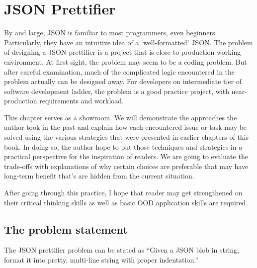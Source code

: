 
\chapter{JSON Prettifier}\label{ch:json-prettifier}

By and large, JSON is familiar to most programmers, even beginners.
Particularly, they have an intuitive idea of a `well-formatted' JSON\@.
The problem of designing a JSON prettifier is a project that is close to production working
environment.
At first sight, the problem may seem to be a coding problem.
But after careful examination, much of the complicated logic encountered in
the problem actually can be designed away.
For developers on intermediate tier of software development ladder,
the problem is a good practice project, with near-production requirements and workload.

This chapter serves as a showroom.
We will demonstrate the approaches the author took in the past and
explain how each encountered issue or task may be solved using the various strategies that were
presented in earlier chapters of this book.
In doing so, the author hope to put those techniques and strategies in a practical perspective
for the inspiration of readers.
We are going to evaluate the trade-offs with explanations of why certain choices are preferable
that may have long-term benefit that's are hidden from the current situation.

After going through this practice, I hope that reader may get strengthened on their critical
thinking skills as well as basic OOD application skills are required.

\section{The problem statement}\label{sec:theProblemStatement.Json}

The JSON prettifier problem can be stated as ``Given a JSON blob in string, format
it into pretty, multi-line string with proper indentation.''

